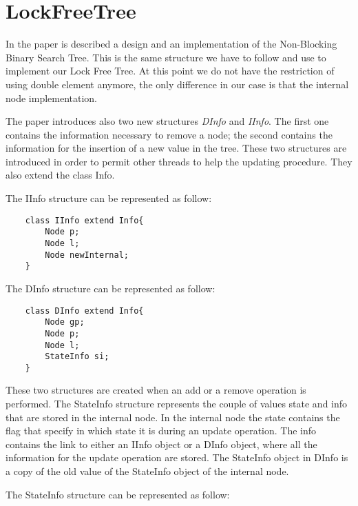 \section{LockFreeTree}

In the paper \cite{nonblock} is described a design and an implementation of the Non-Blocking Binary Search Tree. This is the same structure we have to follow and use to implement our Lock Free Tree. At this point we do not have the restriction of using double element anymore, the only difference in our case is that the internal node implementation.\newline

The paper introduces also two new structures \emph{DInfo} and \emph{IInfo}. The first one contains the information necessary to remove a node; the second contains the information for the insertion of a new value in the tree. These two structures are introduced in order to permit other threads to help the updating procedure. They also extend the class Info.\newline

The IInfo structure can be represented as follow:\newline

\begin{lstlisting}
	class IInfo extend Info{
		Node p;
		Node l;
		Node newInternal;
	}
\end{lstlisting}

The DInfo structure can be represented as follow:\newline

\begin{lstlisting}
	class DInfo extend Info{
		Node gp;
		Node p;
		Node l;
		StateInfo si;
	}
\end{lstlisting}

These two structures are created when an add or a remove operation is performed. The StateInfo structure represents the couple of values state and info that are stored in the internal node. In the internal node the state contains the flag that specify in which state it is during an update operation. The info contains the link to either an IInfo object or a DInfo object, where all the information for the update operation are stored. The StateInfo object in DInfo is a copy of the old value of the StateInfo object of the internal node.\newline

The StateInfo structure can be represented as follow:\newline

